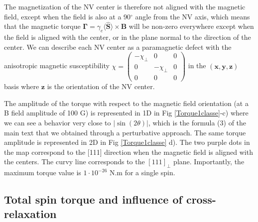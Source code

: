\documentclass[preprintnumbers,amsmath,amssymb,onecolumn,12pt]{revtex4}
\begin{document}
The magnetization of the NV center is therefore not aligned with the magnetic field, except when the field is also at a 90$^\circ$ angle from the NV axis, which means that the magnetic torque $\mathbf \Gamma = \gamma_e \langle\hat{\mathbf S}\rangle \times \mathbf B $ will be non-zero everywhere except when the field is aligned with the center, or in the plane normal to the direction of the center. We can describe each NV center as a paramagnetic defect with the anisotropic magnetic susceptibility $\chi = \begin{pmatrix}-\chi_\perp & 0 & 0\\ 0 & -\chi_\perp & 0 \\ 0 & 0 & 0  \end{pmatrix}$ in the $(\mathbf{x},\mathbf{y},\mathbf{z})$ basis where $\mathbf{z}$ is the orientation of the NV center.

The amplitude of the torque with respect to the magnetic field orientation (at a B field amplitude of 100 G) is represented in 1D in Fig \ref{Torque1classe}-c) where we can see a behavior very close to $|\sin(2\theta)|$, which is the formula (3) of the main text that we obtained through a perturbative approach. The same torque amplitude is represented in 2D in Fig \ref{Torque1classe} d). The two purple dots in the map correspond to the [111] direction when the magnetic field is aligned with the centers. The curvy line corresponds to the $[111]_\perp$ plane. Importantly, the maximum torque value is $1\cdot 10^{-26}$ N.m for a single spin.

\subsection{Total spin torque and influence of cross-relaxation}

\end{document}

